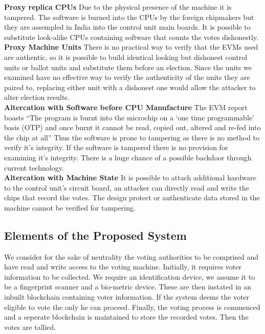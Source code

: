 \documentclass{report}
\begin{document}
\textbf{Proxy replica CPUs} Due to the physical presence of the machine it is tampered. The software is burned into the CPUs by the foreign chipmakers but they are assempled in India into the control unit main boards. It is possible to substitute look-alike CPUs containing software that counts the votes dishonestly. 
\\
\textbf{Proxy Machine Units} There is no practical way to verify that the EVMs used are authentic, so it is possible to build identical looking but dishonest control units or ballot units and substitute them before an election. Since the units we examined have no effective way to verify the authenticity of the units they are paired to, replacing either unit with a dishonest one would allow the attacker to alter election results.
\\
\textbf{Altercation with Software before CPU Manufacture} The EVM report boasts “The program is burnt into the microchip on a ‘one time programmable’ basis (OTP) and once burnt it cannot be read, copied out, altered and re-fed into the chip at all” Thus the software is prone to tampering as there is no method to verify it’s integrity. If the software is tampered there is no provision for examining it’s integrity. There is a huge chance of a possible backdoor through current technology.\\
\textbf{Altercation with Machine State} It is possible to attach additional hardware to the control unit’s circuit board, an attacker can directly read and write the chips that record the votes. The design protect or authenticate data stored in the machine cannot be verified for tampering.\\ \cite{agarwala2006report}
\subsection{Elements of the Proposed System}
We consider for the sake of neutrality the voting authorities to be comprised and have read and write access to the voting machine. Initially, it requires voter information to be collected.
We require an identification device, we assume it to be a fingerprint scanner and a bio-metric device. These are then instated in an inbuilt blockchain containing voter information. If the system deems the voter eligible to vote the only he can proceed.
Finally, the voting process is commenced and a seperate blockchain is maintained to store the recorded votes. Then the votes are tallied.
\end{document}
